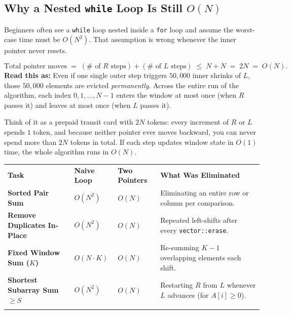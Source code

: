 \documentclass[11pt,a4paper]{article}
\theoremstyle{definition}
\begin{document}
\subsection{Why a Nested \texttt{while} Loop Is Still $O(N)$}

Beginners often see a \texttt{while} loop nested inside a \texttt{for} loop and assume the worst-case time must be $O(N^2)$. That assumption is wrong whenever the inner pointer never resets.

\begin{formulabox}
$$\text{Total pointer moves} \;=\; (\#\text{ of } R\text{ steps}) + (\#\text{ of } L\text{ steps}) \;\le\; N + N \;=\; 2N \;=\; O(N).$$
\textbf{Read this as:} Even if one single outer step triggers $50{,}000$ inner shrinks of $L$, those $50{,}000$ elements are evicted \emph{permanently}. Across the entire run of the algorithm, each index $0, 1, \dots, N-1$ enters the window at most once (when $R$ passes it) and leaves at most once (when $L$ passes it).
\end{formulabox}

Think of it as a prepaid transit card with $2N$ tokens: every increment of $R$ or $L$ spends $1$ token, and because neither pointer ever moves backward, you can never spend more than $2N$ tokens in total. If each step updates window state in $O(1)$ time, the whole algorithm runs in $O(N)$.

\begingroup\small{}
\begin{tabularx}{\textwidth}{>{\raggedright\arraybackslash\bfseries}p{4.1cm} >{\centering\arraybackslash}p{2.2cm} >{\centering\arraybackslash}p{2.2cm} >{\raggedright\arraybackslash}X}
\arrayrulecolor{primaryblue}\toprule[1.2pt]
\rowcolor{primaryblue!10}
\textcolor{primaryblue}{\textbf{Task}} & \textcolor{primaryblue}{\textbf{Naive Loop}} & \textcolor{primaryblue}{\textbf{Two Pointers}} & \textcolor{primaryblue}{\textbf{What Was Eliminated}} \\
\arrayrulecolor{codeframe}\midrule[0.6pt]
Sorted Pair Sum & $O(N^2)$ & $O(N)$ & Eliminating an entire row or column per comparison. \\
Remove Duplicates In-Place & $O(N^2)$ & $O(N)$ & Repeated left-shifts after every \texttt{vector::erase}. \\
Fixed Window Sum ($K$) & $O(N \cdot K)$ & $O(N)$ & Re-summing $K - 1$ overlapping elements each shift. \\
Shortest Subarray Sum $\ge S$ & $O(N^2)$ & $O(N)$ & Restarting $R$ from $L$ whenever $L$ advances (for $A[i] \ge 0$). \\
\arrayrulecolor{primaryblue}\bottomrule[1.2pt]
\end{tabularx}\endgroup
\end{document}
